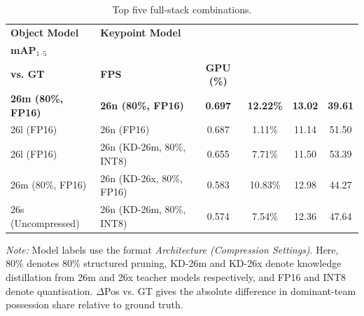 \begin{table}[H]
\centering
\footnotesize
\caption{Top five full-stack combinations.}
\label{tab:fullstack_rank02_top5}

\begin{tabularx}{\textwidth}{@{}>{\raggedright\arraybackslash}X >{\raggedright\arraybackslash}X |c c c c@{}}
\toprule
\textbf{Object Model} &
\textbf{Keypoint Model} &
\makecell[c]{\textbf{Pass}\\\textbf{mAP$_{1\text{--}5}$}} &
\makecell[c]{\textbf{$\Delta$Pos}\\\textbf{vs. GT}} &
\textbf{FPS} &
\textbf{GPU (\%)} \\
\midrule

\textbf{26m (80\%, FP16)} &
\textbf{26n (80\%, FP16)} &
\textbf{0.697} &
\textbf{12.22\%} &
\textbf{13.02} &
\textbf{39.61} \\

26l (FP16) &
26n (FP16) &
0.687 &
1.11\% &
11.14 &
51.50 \\

26l (FP16) &
26n (KD-26m, 80\%, INT8) &
0.655 &
7.71\% &
11.50 &
53.39 \\

26m (80\%, FP16) &
26n (KD-26x, 80\%, FP16) &
0.583 &
10.83\% &
12.98 &
44.27 \\

26s (Uncompressed) &
26n (KD-26m, 80\%, INT8) &
0.574 &
7.54\% &
12.36 &
47.64 \\
\bottomrule
\end{tabularx}

\vspace{2pt}
\begin{minipage}{\textwidth}
\footnotesize
\textit{Note:} Model labels use the format \textit{Architecture (Compression Settings)}. Here, 80\% denotes 80\% structured pruning, KD-26m and KD-26x denote knowledge distillation from 26m and 26x teacher models respectively, and FP16 and INT8 denote quantisation. $\Delta$Pos vs. GT gives the absolute difference in dominant-team possession share relative to ground truth.
\end{minipage}
\end{table}
